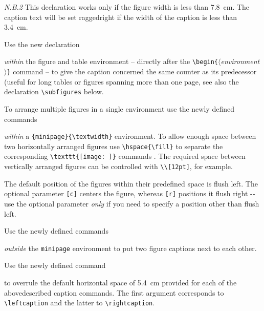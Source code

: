 \documentclass[graybox]{svmult}
\begin{document}
\begin{refguide}
\begin{sloppy}
\textit{N.B.2} This declaration works only if the figure width is less than 7.8~cm. The
caption text will be set raggedright if the width of the caption is less than 3.4~cm.

Use the new declaration

\cprotect\boxtext{\verb|\samenumber|}

\textit{within} the figure and table environment -- directly after the \verb|\begin{|$\langle$\textit{environment}$\rangle$\verb|}|
command -- to give the caption concerned the same counter as its predecessor
(useful for long tables or figures spanning more than one page, see also the
declaration \verb|\subfigures| below.

To arrange multiple figures in a single environment use the newly defined commands

\cprotect{}

\textit{within} a \verb|{minipage}{\textwidth}| environment. To allow enough space between two horizontally arranged figures use \verb|\hspace{\fill}| to separate the
corresponding \verb|\texttt{[image: ]}| commands . The required space between
vertically arranged figures can be controlled with \verb|\\[12pt]|, for example.

The default position of the figures within their predefined space is flush left.
The optional parameter \verb|[c]| centers the figure, whereas \verb|[r]| positions it flush
right -­ use the optional parameter \textit{only} if you need to specify a position other
than flush left.

Use the newly defined commands

\cprotect{}

\textit{outside} the \verb|minipage| environment to put two figure captions next to each other.

Use the newly defined command

\cprotect{}

to overrule the default horizontal space of 5.4~cm provided for each of the abovedescribed caption commands. The first argument corresponds to \verb|\leftcaption| and the latter to \verb|\rightcaption|.


\end{sloppy}
\end{refguide}
\end{document}
